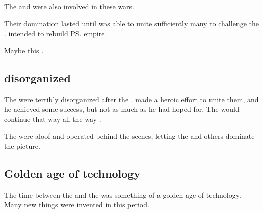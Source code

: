 The \vorcanths{} and \nagae{} were also involved in these wars. 

Their domination lasted until \Nexagglachel{} was able to unite sufficiently many \dragons{} to challenge the \quiljaaran. 
\Nexagglachel{} intended to rebuild \ps{\TyarithXserasshana} empire. 

Maybe this  .









\subsection{\Dragons{} disorganized}
The \dragons{} were terribly disorganized after the \firstbanewar. 
\Nexagglachel{} made a heroic effort to unite them, and he achieved some success, but not as much as he had hoped for. 
The \dragons{} would continue that way all the way . 

The \dragons{} were aloof and operated behind the scenes, letting the \quiljaaran{} and others dominate the picture. 









\subsection{Golden age of technology}
The time between the \firstbanewar{} and the \secondbanewar{} was something of a golden age of technology. 
Many new things were invented in this period. 























